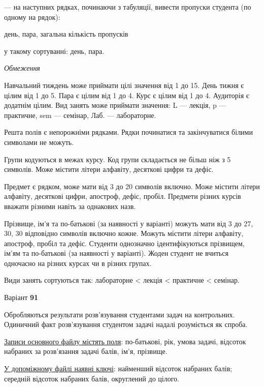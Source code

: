 \documentclass[11pt, ukrainian]{article}
\begin{document}
{\noindent}--- на наступних рядках, починаючи з табуляції, вивести пропуски студента (по одному на рядок):\par
день, пара, загальна кількість пропусків

{\noindent}у такому сортуванні: день, пара.


\bigskip\textit{Обмеження}

Навчальний тиждень може приймати цілі значення від 1 до 15.
День тижня є цілим від 1 до 5. Пара є цілим від 1 до 4.
Курс є цілим від 1 до 4. Аудиторія є додатнім цілим.
Вид занять може приймати значення:
L --- лекція, p --- практичне, sem --- семінар, Лаб. --- лабораторне.

Решта полів є непорожніми рядками.
Рядки починатися та закінчуватися білими символами не можуть.

Групи кодуються в межах курсу.
Код групи складається не більш ніж з 5 символів.
Може містити літери алфавіту, десяткові цифри та дефіс.

Предмет є рядком, може мати від 3 до 20 символів включно.
Може містити літери алфавіту, десяткові цифри, апостроф, дефіс, пробіл.
Предмети різних курсів вважати різними навіть за однакових назв.

Прізвище, ім’я та по-батькові (за наявності у варіанті)
можуть мати від 3 до 27, 30, 30 відповідно символів включно кожне.
Можуть містити літери алфавіту, апостроф, пробіл та дефіс.
Студенти однозначно ідентифікуються прізвищем, ім’ям та по-батькові (за наявності у варіанті).
Жоден студент не вчиться одночасно на різних курсах чи в різних групах.

Види занять сортуються так: лабораторне < лекція < практичне < семінар.





\par
\newpage
{\center Варіант  \No \textbf { 91 }\par}
\bigskip
Обробляються результати розв’язування студентами задач на контрольних.
Одиничний факт роз\-в’я\-зу\-вання студентом задачі надалі розуміється як спроба.

\underline{Записи основного файлу містять поля}: по-батькові, рік, умова задачі, відсоток набраних за розв’я\-зан\-ня задачі балів, ім’я, прізвище.

\underline{У допоміжному файлі наявні ключі}: найменший відсоток набраних балів; середній відсоток набраних балів, округлений до цілого.
\end{document}
